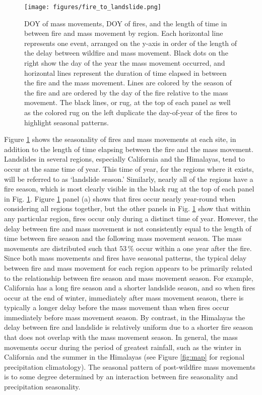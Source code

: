 \documentclass[nhess, manuscript]{copernicus}
\begin{document}
\begin{figure}
\centering
\texttt{[image: figures/fire\_to\_landslide.png]}
\caption{DOY of mass movements, DOY of fires, and the length of time in between fire and mass movement by region. Each horizontal line represents one event, arranged on the y-axis in order of the length of the delay between wildfire and mass movement. Black dots on the right show the day of the year the mass movement occurred, and horizontal lines represent the duration of time elapsed in between the fire and the mass movement. Lines are colored by the season of the fire and are ordered by the day of the fire relative to the mass movement. The black lines, or rug, at the top of each panel as well as the colored rug on the left duplicate the day-of-year of the fires to highlight seasonal patterns.}
\label{fig:fire-landslide-timing}
\end{figure}

Figure \ref{fig:fire-landslide-timing} shows the seasonality of fires and mass movements
at each site, in addition to the length of time elapsing between the
fire and the mass movement. Landslides in several regions, especially
California and the Himalayas, tend to occur at the same time of year.
This time of year, for the regions where it exists, will be referred to
as `landslide season.' Similarly, nearly all of the regions have a fire
season, which is most clearly visible in the black rug at the top of
each panel in Fig. \ref{fig:fire-landslide-timing}. Figure 
\ref{fig:fire-landslide-timing} panel (a) shows that 
fires occur nearly year-round when considering all regions together, 
but the other panels in Fig. \ref{fig:fire-landslide-timing} show that within any particular region, 
fires occur only during a distinct time of year. However, the delay between 
fire and mass movement is not consistently equal to the length of time between 
fire season and the following mass movement season. The mass movements are distributed 
such that \(53\,\%\) occur
within a one year after the fire. Since both mass movements and fires have seasonal patterns, the
typical delay between fire and mass movement for each region appears to be
primarily related to the relationship between fire season and mass movement
season. For example, California has a long fire season and a shorter
landslide season, and so when fires occur at the end of winter,
immediately after mass movement season, there is typically a longer delay
before the mass movement than when fires occur immediately before mass movement
season. By contrast, in the Himalayas the delay between fire and
landslide is relatively uniform due to a shorter fire season that does
not overlap with the mass movement season. In general, the mass movements occur during the period of greatest rainfall, such as the winter in California and the summer in the Himalayas (see Figure \ref{fig:map} for regional precipitation climatology). The seasonal pattern of post-wildfire mass movements is to some degree determined by an interaction between fire seasonality and precipitation seasonality. 
\end{document}
